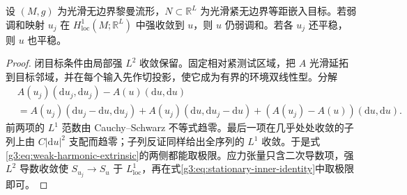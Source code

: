 \begin{proposition}\label{g3:prop:strong-limit-weak-harmonic}
	设 \((M,g)\) 为光滑无边界黎曼流形，\(N\subset\mathbb R^L\) 为光滑紧无边界等距嵌入目标。若弱调和映射 \(u_j\) 在 \(H^1_{\mathrm{loc}}(M;\mathbb R^L)\) 中强收敛到 \(u\)，则 \(u\) 仍弱调和。若各 \(u_j\) 还平稳，则 \(u\) 也平稳。
\end{proposition}
\begin{proof}
	闭目标条件由局部强 \(L^2\) 收敛保留。固定相对紧测试区域，把 \(A\) 光滑延拓到目标邻域，并在每个输入先作切投影，使它成为有界的环境双线性型。分解
	\[
	\begin{aligned}
	&A(u_j)(\mathrm du_j,\mathrm du_j)-A(u)(\mathrm du,\mathrm du)\\
	&=A(u_j)(\mathrm du_j-\mathrm du,\mathrm du_j)
	 +A(u_j)(\mathrm du,\mathrm du_j-\mathrm du)
	 +(A(u_j)-A(u))(\mathrm du,\mathrm du).
	\end{aligned}
	\]
	前两项的 \(L^1\) 范数由 Cauchy--Schwarz 不等式趋零。最后一项在几乎处处收敛的子列上由 \(C|\mathrm du|^2\) 支配而趋零；子列反证同样给出全序列的 \(L^1\) 收敛。于是式\eqref{g3:eq:weak-harmonic-extrinsic}的两侧都能取极限。应力张量只含二次导数项，强 \(L^2\) 导数收敛使 \(S_{u_j}\to S_u\) 于 \(L^1_{\mathrm{loc}}\)，再在式\eqref{g3:eq:stationary-inner-identity}中取极限即可。
\end{proof}

